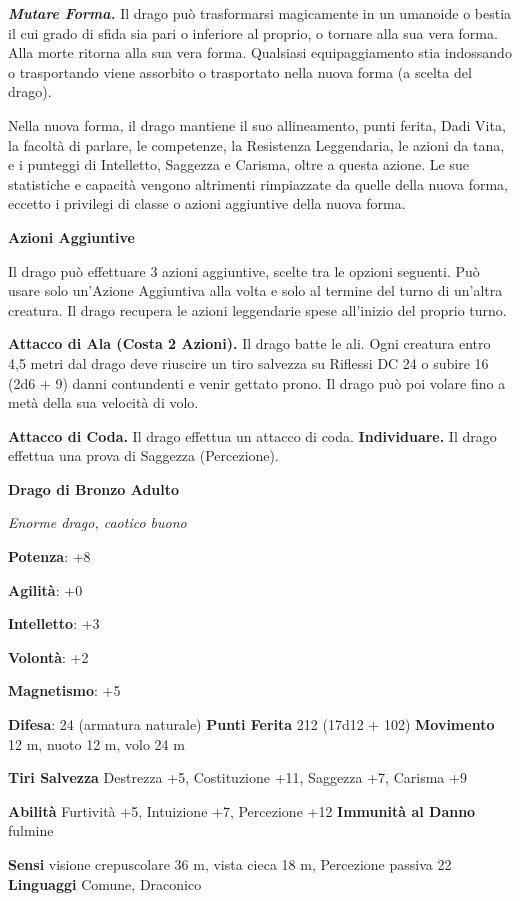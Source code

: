 \begin{multicols}{2}
\emph{\textbf{Mutare Forma.}} Il drago può trasformarsi magicamente in
un umanoide o bestia il cui grado di sfida sia pari o inferiore al
proprio, o tornare alla sua vera forma. Alla morte ritorna alla sua vera
forma. Qualsiasi equipaggiamento stia indossando o trasportando viene
assorbito o trasportato nella nuova forma (a scelta del drago).

Nella nuova forma, il drago mantiene il suo allineamento, punti ferita,
Dadi Vita, la facoltà di parlare, le competenze, la Resistenza
Leggendaria, le azioni da tana, e i punteggi di Intelletto, Saggezza e
Carisma, oltre a questa azione. Le sue statistiche e capacità vengono
altrimenti rimpiazzate da quelle della nuova forma, eccetto i privilegi
di classe o azioni aggiuntive della nuova forma.

\textbf{Azioni Aggiuntive}

Il drago può effettuare 3 azioni aggiuntive, scelte tra le opzioni
seguenti. Può usare solo un'Azione Aggiuntiva alla volta e solo al
termine del turno di un'altra creatura. Il drago recupera le azioni
leggendarie spese all'inizio del proprio turno.

\textbf{Attacco di Ala (Costa 2 Azioni).} Il drago batte le ali. Ogni
creatura entro 4,5 metri dal drago deve riuscire un tiro salvezza su Riflessi DC 24 o subire 16 (2d6 + 9) danni contundenti e venir gettato
prono. Il drago può poi volare fino a metà della sua velocità di volo.

\textbf{Attacco di Coda.} Il drago effettua un attacco di coda.
\textbf{Individuare.} Il drago effettua una prova di Saggezza
(Percezione).

\textbf{Drago di Bronzo Adulto}

\emph{Enorme drago, caotico buono}

\textbf{Potenza}: +8

\textbf{Agilità}: +0

\textbf{Intelletto}: +3

\textbf{Volontà}: +2

\textbf{Magnetismo}: +5

\textbf{Difesa}: 24 (armatura naturale) \textbf{Punti Ferita}
212 (17d12 + 102) \textbf{Movimento} 12 m, nuoto 12 m, volo 24 m

\textbf{Tiri Salvezza} Destrezza +5, Costituzione +11, Saggezza +7,
Carisma +9

\textbf{Abilità} Furtività +5, Intuizione +7, Percezione +12
\textbf{Immunità al Danno} fulmine

\textbf{Sensi} visione crepuscolare 36 m, vista cieca 18 m, Percezione passiva
22 \textbf{Linguaggi} Comune, Draconico


\end{multicols}
